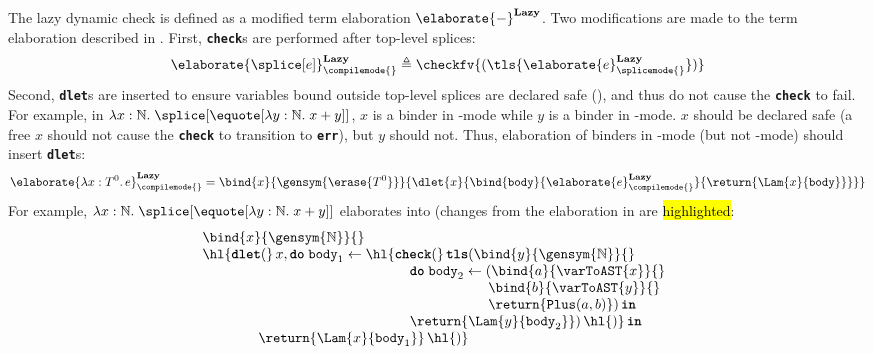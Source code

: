 The lazy dynamic check is defined as a modified term elaboration ${\elaborate{-}}^{\textbf{Lazy}}$. Two modifications are made to the term elaboration described in . First, \textbf{\texttt{check}}s are performed after top-level splices:
\[\elaborate{\splice[e]}_{\compilemode{}}^{\textbf{Lazy}} \triangleq {\checkfv{(\tls{\elaborate{e}_{\splicemode{}}^{\textbf{Lazy}}})}}\]
Second, \textbf{\texttt{dlet}}s are inserted to ensure variables bound outside top-level splices are declared safe (), and thus do not cause the \textbf{\texttt{check}} to fail. For example, in $\lambda x:\mathbb{N}. \; \splice[{\equote[\lambda{y}: \mathbb{N}. \; x+y]}]$, $x$ is a binder in \compilemode{}-mode while $y$ is a binder in \quotemode{}-mode. $x$ should be declared safe (a free $x$ should not cause the \textbf{\texttt{check}} to transition to \textbf{\texttt{err}}), but $y$ should not. Thus, elaboration of binders in \compilemode{}-mode (but not \quotemode{}-mode) should insert \textbf{\texttt{dlet}}s:
{
  \footnotesize
\[\elaborate{\lambda x: T^0. \, e}_{\compilemode{}}^{\textbf{Lazy}} = \bind{x}{\gensym{\erase{T^0}}}{ \dlet{x}{\bind{\texttt{body}}{\elaborate{e}_{\compilemode{}}^\textbf{Lazy}}{\return{\Lam{x}{\texttt{body}}}}}}\]
}
\newcommand{\indentone}{\quad\quad\quad\quad\quad\quad\quad\quad
    \quad\quad\quad\quad\quad\quad\;\;\;}
    \newcommand{\indenttwo}{\quad\quad\quad\quad\quad\;\,\,}
    \newcommand{\indentthree}{\quad\quad\quad\quad}
For example, $\lambda x:\mathbb{N}. \; \splice[{\equote[\lambda{y}: \mathbb{N}. \; x+y]}]$ elaborates into (changes from the elaboration in  are \hl{highlighted}:
{
\[\begin{array}{@{}l}
  \bind{x}{\gensym{\mathbb{N}}}{} \\
  \hl{\textbf{\texttt{dlet}}(}\, {x}, \textbf{\texttt{do}} \; {\texttt{body}_1} \leftarrow \hl{\textbf{\texttt{check}}(}\,\textbf{\texttt{tls}}({\bind{y}{\gensym{\mathbb{N}}}{}} \\
    \indentone
    \textbf{\texttt{do}}\;{\texttt{body}_2} \leftarrow {(\bind{a}{\varToAST{x}}{}}\\
    \indentone\indenttwo
    \bind{b}{\varToAST{y}}{}\\
    \indentone\indenttwo
    \return{\texttt{Plus}(a, b)}) \, \textbf{\texttt{in}}\\
    \indentone
    \return{\Lam{y}{\texttt{body}_2}})\,\hl{)}\,\textbf{\texttt{in}}\\
  \indentthree{\return{\Lam{x}{\texttt{body}_1}}}\,\hl{)}
\end{array}\]
}

